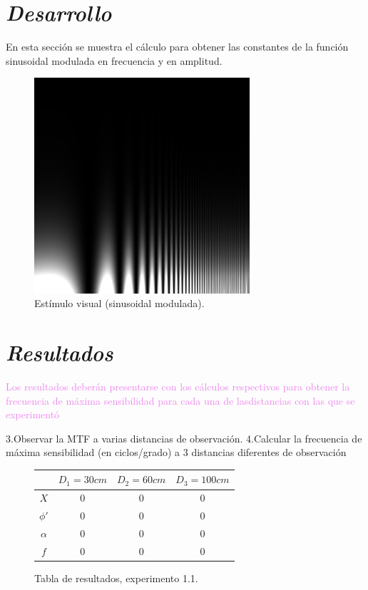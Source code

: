 \documentclass[conference]{IEEEtran}
\begin{document}
\section{\textit{Desarrollo}}

En esta sección se muestra el cálculo para obtener las constantes de la función sinusoidal modulada en frecuencia y en amplitud.





\begin{figure}[htbp]
\centerline{\includegraphics[width=80mm]{code/mtf}}
\caption{Estímulo visual (sinusoidal modulada).}
\label{mtf}
\end{figure}


\section{\textit{Resultados}}
\textcolor{violet}{Los resultados deberán presentarse con los cálculos respectivos para obtener la frecuencia de máxima sensibilidad para cada una de lasdistancias con las que se experimentó}

3.Observar la MTF a varias distancias de observación.
4.Calcular la frecuencia de máxima sensibilidad (en ciclos/grado) a 3 distancias diferentes de observación


\begin{figure}[htbp]
\centering

\begin{tabular}{c|c|c|c|}
	 & $D_1=30cm$ & $D_2=60cm$ & $D_3=100 cm$\\
	\hline
	$X$ & 0 & 0 & 0\\
	\hline
	$\phi'$ & 0 & 0 & 0\\
	\hline
	$\alpha$ & 0 & 0 & 0\\
	\hline
	$f$ & 0 & 0 & 0\\
	\hline
\end{tabular}

\caption{Tabla de resultados, experimento 1.1.}
\label{res1.1}
\end{figure}
\end{document}
